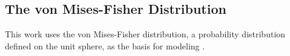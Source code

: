\subsection{The von Mises-Fisher Distribution}

This work uses the von Mises-Fisher distribution, a probability distribution defined on the unit sphere, as the basis for modeling .